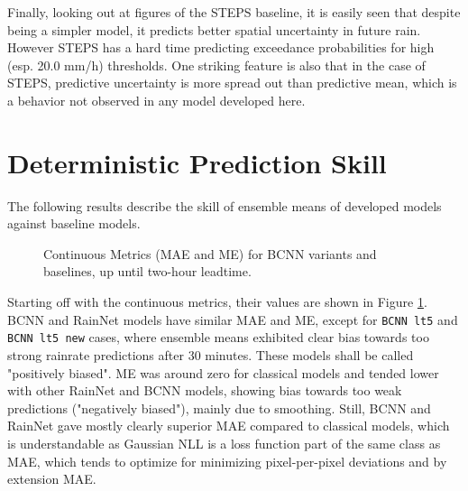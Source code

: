 Finally, looking out at figures of the STEPS baseline, it is easily seen that despite being a simpler model, it predicts better spatial uncertainty in future rain. However STEPS has a hard time predicting exceedance probabilities for high (esp. 20.0 mm/h) thresholds. One striking feature is also that in the case of STEPS, predictive uncertainty is more spread out than predictive mean, which is a behavior not observed in any model developed here. 


\section{Deterministic Prediction Skill}

The following results describe the skill of ensemble means of developed models against baseline models.%

\begin{figure}[H]
	\centering

	\caption{Continuous Metrics (MAE and ME) for BCNN variants and baselines, up until two-hour leadtime.}
	\label{fig:cont-metrics}
\end{figure}

Starting off with the continuous metrics, their values are shown in Figure \ref{fig:cont-metrics}. BCNN and RainNet models have similar MAE and ME, except for \texttt{BCNN lt5} and \texttt{BCNN lt5 new} cases, where ensemble means exhibited clear bias towards too strong rainrate predictions after 30 minutes. These models shall be called "positively biased". ME was around zero for classical models and tended lower with other RainNet and BCNN models, showing bias towards too weak predictions ("negatively biased"), mainly due to smoothing. Still, BCNN and RainNet gave mostly clearly superior MAE compared to classical models, which is understandable as Gaussian NLL is a loss function part of the same class as MAE, which tends to optimize for minimizing pixel-per-pixel deviations and by extension MAE. 

